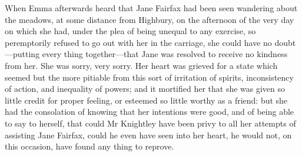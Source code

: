 When Emma afterwards heard that Jane Fairfax had been seen wandering about the meadows, at some distance from Highbury, on the afternoon of the very day on which she had, under the plea of being unequal to any exercise, so peremptorily refused to go out with her in the carriage, she could have no doubt—putting every thing together—that Jane was resolved to receive no kindness from her. She was sorry, very sorry. Her heart was grieved for a state which seemed but the more pitiable from this sort of irritation of spirits, inconsistency of action, and inequality of powers; and it mortified her that she was given so little credit for proper feeling, or esteemed so little worthy as a friend: but she had the consolation of knowing that her intentions were good, and of being able to say to herself, that could Mr Knightley have been privy to all her attempts of assisting Jane Fairfax, could he even have seen into her heart, he would not, on this occasion, have found any thing to reprove.